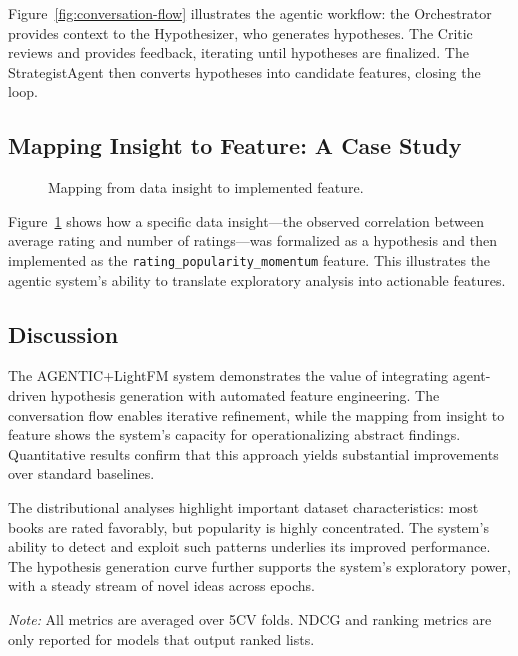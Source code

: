 Figure~\ref{fig:conversation-flow} illustrates the agentic workflow: the Orchestrator provides context to the Hypothesizer, who generates hypotheses. The Critic reviews and provides feedback, iterating until hypotheses are finalized. The StrategistAgent then converts hypotheses into candidate features, closing the loop.

\subsection{Mapping Insight to Feature: A Case Study}

\begin{figure}[h]
\centering
{}
\caption{Mapping from data insight to implemented feature.}
\label{fig:insight-to-feature}
\end{figure}

Figure~\ref{fig:insight-to-feature} shows how a specific data insight---the observed correlation between average rating and number of ratings---was formalized as a hypothesis and then implemented as the \texttt{rating\_popularity\_momentum} feature. This illustrates the agentic system's ability to translate exploratory analysis into actionable features.

\subsection{Discussion}

The AGENTIC+LightFM system demonstrates the value of integrating agent-driven hypothesis generation with automated feature engineering. The conversation flow enables iterative refinement, while the mapping from insight to feature shows the system's capacity for operationalizing abstract findings. Quantitative results confirm that this approach yields substantial improvements over standard baselines.

The distributional analyses highlight important dataset characteristics: most books are rated favorably, but popularity is highly concentrated. The system's ability to detect and exploit such patterns underlies its improved performance. The hypothesis generation curve further supports the system's exploratory power, with a steady stream of novel ideas across epochs.

\textit{Note:} All metrics are averaged over 5CV folds. NDCG and ranking metrics are only reported for models that output ranked lists.

